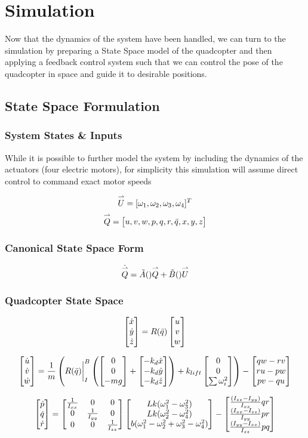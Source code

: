 \section{Simulation}
Now that the dynamics of the system have been handled, we can turn to the simulation by preparing a State Space model of the quadcopter and then applying a feedback control system such that we can control the pose of the quadcopter in space and guide it to desirable positions. 

\subsection{State Space Formulation}

\subsubsection{System States \& Inputs}

While it is possible to further model the system by including the dynamics of the actuators (four electric motors), for simplicity this simulation will assume direct control to command exact motor speeds 
 
$$ \overset{\rightharpoonup}{U} = [\omega_1, \omega_2, \omega_3, \omega_4]^{T} $$
$$ \overset{\rightharpoonup}{Q} = \begin{bmatrix} 
u, v, w, p, q, r, \bar{q}, x, y, z
\end{bmatrix} $$

\subsubsection{Canonical State Space Form}

$$\dot{\overset{\rightharpoonup}{Q}} = \tilde{A}()\overset{\rightharpoonup}{Q} + \tilde{B}()\overset{\rightharpoonup}{U}$$


\subsubsection{Quadcopter State Space}

$$\begin{bmatrix} \dot{x} \\ \dot{y} \\ \dot{z} \end{bmatrix} = R(\bar{q})\begin{bmatrix} u \\ v \\ w \end{bmatrix}$$

$$\begin{bmatrix} \dot{u} \\ \dot{v} \\ \dot{w} \end{bmatrix} = \frac{1}{m}\left(R(\bar{q})\biggr\rvert_{I}^{B}\left(\begin{bmatrix} 0 \\ 0 \\ -mg \end{bmatrix} + \begin{bmatrix} -k_d\dot{x} \\ -k_d\dot{y} \\ -k_d\dot{z} \end{bmatrix}\right) + k_{lift}\begin{bmatrix} 0 \\ 0 \\ \sum\omega_{i}^{2} \end{bmatrix} \right) - \begin{bmatrix} q w - r v \\ r u -p w \\ p v - q u \end{bmatrix}$$

$$\begin{bmatrix} \dot{p} \\ \dot{q} \\ \dot{r} \end{bmatrix} = \begin{bmatrix}
    \frac{1}{I_{xx}} & 0 & 0 \\
    0 & \frac{1}{I_{yy}} & 0 \\
    0 & 0 & \frac{1}{I_{zz}} \\
\end{bmatrix} \begin{bmatrix} Lk(\omega_{1}^{2} - \omega_{3}^{2}) \\ Lk(\omega_{2}^{2} - \omega_{4}^{2}) \\ b(\omega_{1}^{2}- \omega_{2}^{2} + \omega_{3}^{2} - \omega_{4}^{2}) \end{bmatrix}- \begin{bmatrix} \frac{(I_{zz} - I_{yy})}{I_{xx}}qr \\ \frac{(I_{xx} - I_{zz})}{I_{yy}}pr \\ \frac{(I_{yy}- I_{xx})}{I_{zz}}pq \end{bmatrix}$$


